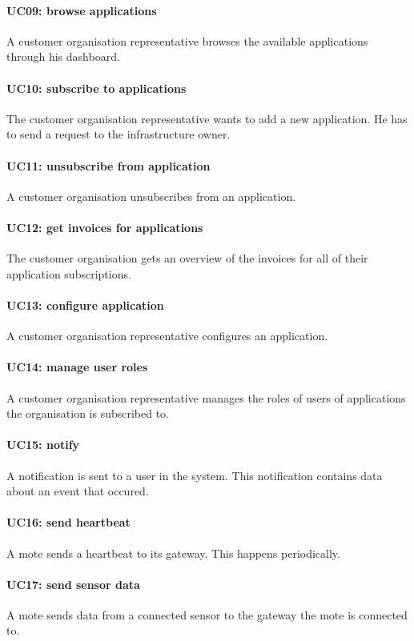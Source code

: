 \paragraph{UC09: browse applications}
A customer organisation representative browses the available applications
through his dashboard.
\paragraph{UC10: subscribe to applications}
The customer organisation representative wants to add a new application. He has
to send a request to the infrastructure owner.
\paragraph{UC11: unsubscribe from application}
A customer organisation unsubscribes from an application.
\paragraph{UC12: get invoices for applications}
The customer organisation gets an overview of the invoices for
all of their application subscriptions.
\paragraph{UC13: configure application}
A customer organisation representative configures an application.
\paragraph{UC14: manage user roles}
A customer organisation representative manages the roles of users of applications
the organisation is subscribed to.
\paragraph{UC15: notify}
A notification is sent to a user in the system. This notification contains
data about an event that occured.
\paragraph{UC16: send heartbeat}
A mote sends a heartbeat to its gateway. This happens periodically.
\paragraph{UC17: send sensor data}
A mote sends data from a connected sensor to the gateway the mote is connected to.
